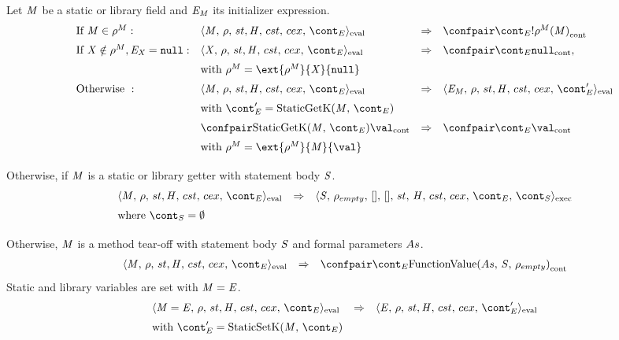 \documentclass{article}
\begin{document}
\noindent
Let $\mathit{M}$ be a static or library field and $\mathit{E}_{\mathit{M}}$ its initializer expression.
\[
  \begin{array}{llcl}
	\textrm{If }\membermeta \in \env^{M}:
	&\cesktrans{\evalconf{
		\StaticGet{\membermeta}}{\env}{\strace}{\cstrace}{\cex}{\econt}}{
		\contconf{\econt}{\deref{\env^{M}(\membermeta)}}}
		\\[2mm]

	\textrm{If }\idmeta \notin \env^{M}, \expressionmeta_{\idmeta} = \tt{null}:
	&\cesktrans{
		\evalconf{\StaticGet{\idmeta}}{\env}{\strace}{\cstrace}{\cex}{\econt}}{
		\contconf{\econt}{\tt{null}}},
		\\[2mm]
	&\textrm{with }\env^{M} = \ext{\env^{M}}{\idmeta}{\tt{null}}
	\\[2mm]

	\textrm{Otherwise }:
	&\cesktrans{\evalconf{
		\StaticGet{\membermeta}}{\env}{\strace}{\cstrace}{\cex}{\econt}}{
		\evalconf{\expressionmeta_{\membermeta}}{\env}{\strace}{\cstrace}{\cex}{\econt'}}
		\\[2mm]
	&\textrm{with }\econt' = \StaticGetK
	\\[2mm]

	&\cesktrans{
		\contconf{\StaticGetK}{\val}}{
		\contconf{\econt}{\val}}
		\\[2mm]
	&\textrm{with }\env^{M} = \ext{\env^{M}}{\membermeta}{\val}
	\\[2mm]
  \end{array}
\]
Otherwise, if $\mathit{M}$ is a static or library getter with statement body $\mathit{S}$.
\[
  \begin{array}{lcl}
	\cesktrans{
		\evalconf{\StaticGet{\membermeta}}{\env}{\strace}{\cstrace}{\cex}{\econt}}{
		\execconf{\stmt}{\env_{empty}}{[]}{[]}{\handler}{\cstrace}{\cex}{\econt}{\scont}}
		\\[2mm]
	\textrm{where }\scont = \emptyset\\[2mm]
   \end{array}
\]
Otherwise, $\mathit{M}$ is a method tear-off with statement body $\mathit{S}$ and formal parameters $As$.
\[
  \begin{array}{lcl}
	\cesktrans{
		\evalconf{\StaticGet{\membermeta}}{\env}{\strace}{\cstrace}{\cex}{\econt}}{
		\contconf{\econt}{\funval{\formals}{\stmt}{\env_{empty}}}}
   \end{array}
\]
Static and library variables are set with $\mathit{M}=\mathit{E}$.
\newcommand{\StaticSetK}{\mathrm{StaticSetK}(\membermeta,\,\econt)}
\[
  \begin{array}{lcl}
	\cesktrans{
		\evalconf{\StaticSet{\membermeta}{\expressionmeta}}{\env}{\strace}{\cstrace}{\cex}{\econt}}{
		\evalconf{\expressionmeta}{\env}{\strace}{\cstrace}{\cex}{\econt'}}
		\\[2mm]
	\textrm{with }\econt' = \StaticSetK\\[2mm]
  \end{array}
\]
\end{document}
